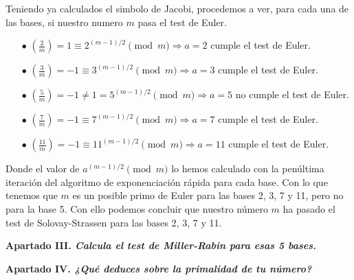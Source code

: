 \documentclass[fleqn]{article}
\begin{document}
    Teniendo ya calculados el simbolo de Jacobi, procedemos a ver, para cada una de las bases, si nuestro numero $m$ pasa el test de Euler.
    \begin{enumerate}
        \item[$\bullet$] $\left(\frac{2}{m}\right) = 1 \equiv 2^{(m-1)/2} \pmod{m} \Rightarrow a = 2 $ cumple el test de Euler.
        \item[$\bullet$] $\left(\frac{3}{m}\right) = -1 \equiv 3^{(m-1)/2} \pmod{m} \Rightarrow a = 3 $ cumple el test de Euler.
        \item[$\bullet$] $\left(\frac{5}{m}\right) = -1 \neq 1 = 5^{(m-1)/2} \pmod{m} \Rightarrow a = 5 $ no cumple el test de Euler.
        \item[$\bullet$] $\left(\frac{7}{m}\right) = -1 \equiv 7^{(m-1)/2} \pmod{m} \Rightarrow a = 7 $ cumple el test de Euler.
        \item[$\bullet$] $\left(\frac{11}{m}\right) = -1 \equiv 11^{(m-1)/2} \pmod{m} \Rightarrow a = 11 $ cumple el test de Euler.
    \end{enumerate}

    Donde el valor de $a^{(m-1)/2} \pmod{m}$ lo hemos calculado con la penúltima iteración del algoritmo de exponenciación rápida para cada base.
    Con lo que tenemos que $m$ es un posible primo de Euler para las bases 2, 3, 7 y 11, pero no para la base 5.
    Con ello podemos concluir que nuestro número $m$ ha pasado el test de Solovay-Strassen para las bases 2, 3, 7 y 11.



    \newpage
    \textbf{Apartado III. \textit{Calcula el test de Miller-Rabin para esas 5 bases.}}


    \newpage
    \textbf{Apartado IV. \textit{¿Qué deduces sobre la primalidad de tu número?}}
\end{document}
